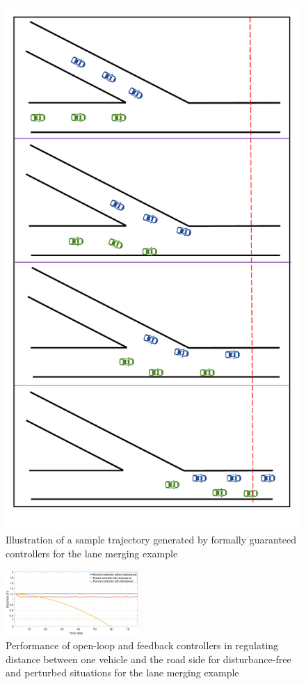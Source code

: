 \begin{figure}[t]
	\centering
	\includegraphics[scale=.21]{figures/merge.pdf}
	\caption{Illustration of a sample trajectory generated by formally guaranteed controllers for the lane merging example}
	\label{fig:merge}
\end{figure}


\begin{figure}[t]
	\centering
	\includegraphics[width=0.45\textwidth]{figures/Merge_plot2.eps}
	\caption{Performance of open-loop and feedback controllers in regulating distance between one vehicle and the road side for disturbance-free and perturbed situations for the lane merging example}
	\label{fig:merging_distance}
\end{figure}

